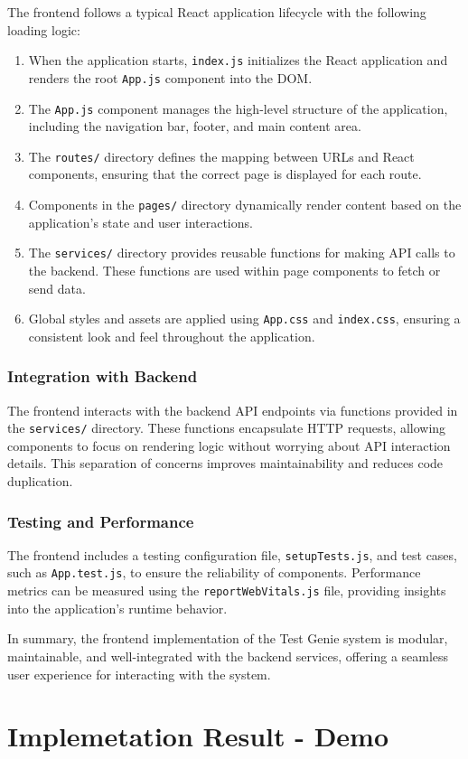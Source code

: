 The frontend follows a typical React application lifecycle with the following loading logic:
\begin{enumerate}
    \item When the application starts, \texttt{index.js} initializes the React application and renders the root \texttt{App.js} component into the DOM.
    \item The \texttt{App.js} component manages the high-level structure of the application, including the navigation bar, footer, and main content area.
    \item The \texttt{routes/} directory defines the mapping between URLs and React components, ensuring that the correct page is displayed for each route.
    \item Components in the \texttt{pages/} directory dynamically render content based on the application's state and user interactions.
    \item The \texttt{services/} directory provides reusable functions for making API calls to the backend. These functions are used within page components to fetch or send data.
    \item Global styles and assets are applied using \texttt{App.css} and \texttt{index.css}, ensuring a consistent look and feel throughout the application.
\end{enumerate}

\subsubsection{Integration with Backend}

The frontend interacts with the backend API endpoints via functions provided in the \texttt{services/} directory. These functions encapsulate HTTP requests, allowing components to focus on rendering logic without worrying about API interaction details. This separation of concerns improves maintainability and reduces code duplication.

\subsubsection{Testing and Performance}

The frontend includes a testing configuration file, \texttt{setupTests.js}, and test cases, such as \texttt{App.test.js}, to ensure the reliability of components. Performance metrics can be measured using the \texttt{reportWebVitals.js} file, providing insights into the application's runtime behavior.

In summary, the frontend implementation of the Test Genie system is modular, maintainable, and well-integrated with the backend services, offering a seamless user experience for interacting with the system.

\section{Implemetation Result - Demo}